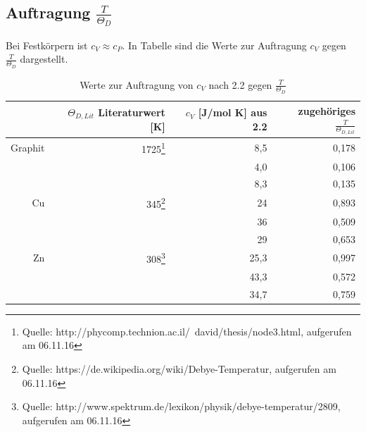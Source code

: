 \documentclass[12pt,a4paper,titlepage,headinclude,bibtotoc]{scrartcl}
\begin{document}


\subsection{Auftragung $\frac{T}{\Theta_D}$}
Bei Festkörpern ist $c_V \approx c_P$. In Tabelle sind die Werte zur Auftragung $c_V$ gegen $\frac{T}{\Theta_D}$ dargestellt. 
\begin{table} [h]
\centering
\caption{Werte zur Auftragung von $c_V$ nach 2.2 gegen $\frac{T}{\Theta_D}$}
\begin{tabular} {r | r |r | r }
&$\Theta_{D,Lit}$ Literaturwert [K] &$c_V$ [J/mol K] aus 2.2& zugehöriges $\frac{T}{\Theta_{D,Lit}}$ \\
\hline
Graphit& 1725\protect\footnote{Quelle: http://phycomp.technion.ac.il/~david/thesis/node3.html, aufgerufen am 06.11.16} &8,5&0,178 \\
&&4,0 & 0,106 \\
&&8,3& 0,135 \\
Cu&345\protect\footnote{Quelle: https://de.wikipedia.org/wiki/Debye-Temperatur, aufgerufen am 06.11.16} &24& 0,893 \\
&&36& 0,509\\
&&29& 0,653\\
Zn&308\protect\footnote{Quelle: http://www.spektrum.de/lexikon/physik/debye-temperatur/2809, aufgerufen am 06.11.16} &25,3& 0,997\\
&&43,3& 0,572\\
&&34,7&0,759\\
\end{tabular}
\end{table}
\end{document}
